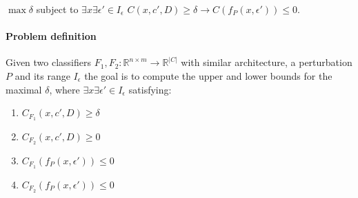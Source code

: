 $\max{\delta}$ subject to $\exists{x}\exists{\epsilon'}\in{I_\epsilon}$ $C(x,c',D) \geq \delta \rightarrow C(f_P(x,\epsilon'))\leq 0$.


\paragraph{Problem definition} Given two classifiers $F_1,F_2: \mathbb{R}^{n \times m} \rightarrow {\mathbb{R}}^{|C|}$ with similar architecture, a perturbation $P$ and its range $I_\epsilon$ the goal is to compute the upper and lower bounds for the maximal $\delta$, where $\exists{x}\exists{\epsilon'}\in{I_\epsilon}$ satisfying:

\begin{enumerate}
    \item $C_{F_1}(x,c',D) \geq \delta$
    \item $C_{F_2}(x,c',D) \geq 0$
    \item $C_{F_1}(f_P(x,\epsilon'))\leq 0$
    \item $C_{F_2}(f_P(x,\epsilon'))\leq 0$
\end{enumerate}

